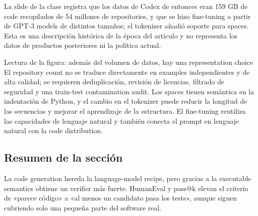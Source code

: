 La slide de la clase registra que los datos de Codex de entonces eran 159 GB de code recopilados de 54 millones de repositories, y que se hizo fine-tuning a partir de GPT-3 models de distintos tamaños; el tokenizer añadió soporte para spaces. Esta es una descripción histórica de la época del artículo y no representa los datos de productos posteriores ni la política actual.


\begin{knowledgebox}{Lectura de la figura: además del volumen de datos, hay una representation choice}
El repository count no se traduce directamente en examples independientes y de alta calidad; se requieren deduplicación, revisión de licencias, filtrado de seguridad y una train-test contamination audit. Los spaces tienen semántica en la indentación de Python, y el cambio en el tokenizer puede reducir la longitud de las secuencias y mejorar el aprendizaje de la estructura. El fine-tuning reutiliza las capacidades de lenguaje natural y también conecta el prompt en lenguaje natural con la code distribution.
\end{knowledgebox}

\subsection{Resumen de la sección}

La code generation hereda la language-model recipe, pero gracias a la executable semantics obtiene un verifier más fuerte. HumanEval y pass@k elevan el criterio de «parece código» a «al menos un candidato pasa los tests», aunque siguen cubriendo solo una pequeña parte del software real.
